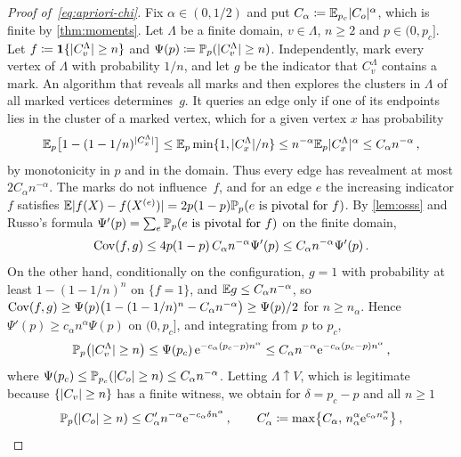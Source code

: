 \begin{proof}[Proof of~\eqref{eq:apriori-chi}]
Fix $\alpha\in(0,1/2)$ and put $C_\alpha\coloneqq\mathbb E_{p_c}\lvert C_o\rvert^\alpha$, which is finite by \cref{thm:moments}.
Let $\Lambda$ be a finite domain, $v\in\Lambda$, $n\ge2$ and $p\in(0,p_c]$. Let
$f\coloneqq\mathbf{1}\{\lvert C_v^\Lambda\rvert\ge n\}$ and $\Psi(p)\coloneqq\mathbb P_p(\lvert C_v^\Lambda\rvert\ge n)$. Independently,
mark every vertex of $\Lambda$ with probability $1/n$, and let $g$ be the indicator that $C_v^\Lambda$
contains a mark. An algorithm that reveals all marks and then explores the clusters in $\Lambda$ of all
marked vertices determines~$g$. It queries an edge only if one of its endpoints lies in the cluster of a
marked vertex, which for a given vertex $x$ has probability
\begin{equation*}
  \mathbb E_p\bigl[1-(1-1/n)^{\lvert C_x^\Lambda\rvert}\bigr]\le\mathbb E_p\min\{1,\lvert C_x^\Lambda\rvert/n\}
  \le n^{-\alpha}\mathbb E_p\lvert C_x^\Lambda\rvert^\alpha\le C_\alpha n^{-\alpha}\,,
\end{equation*}
by monotonicity in $p$ and in the domain. Thus every edge has revealment at most $2C_\alpha n^{-\alpha}$. The marks
do not influence~$f$, and for an edge $e$ the increasing indicator $f$ satisfies
$\mathbb E\lvert f(X)-f(X^{(e)})\rvert=2p(1-p)\mathbb P_p(e\text{ is pivotal for }f)$. By \cref{lem:osss} and Russo's
formula $\Psi'(p)=\sum_e\mathbb P_p(e\text{ is pivotal for }f)$ on the finite domain,
\begin{equation*}
  \operatorname{Cov}(f,g)\le4p(1-p)\,C_\alpha n^{-\alpha}\Psi'(p)\le C_\alpha n^{-\alpha}\Psi'(p)\,.
\end{equation*}
On the other hand, conditionally on the configuration, $g=1$ with probability at least $1-(1-1/n)^n$
on $\{f=1\}$, and $\mathbb E g\le C_\alpha n^{-\alpha}$, so $\operatorname{Cov}(f,g)\ge\Psi(p)\bigl(1-(1-1/n)^n-C_\alpha n^{-\alpha}\bigr)\ge\Psi(p)/2$
for $n\ge n_\alpha$. Hence $\Psi'(p)\ge c_\alpha n^\alpha\Psi(p)$ on $(0,p_c]$, and integrating from $p$ to $p_c$,
\begin{equation*}
  \mathbb P_p\bigl(\lvert C_v^\Lambda\rvert\ge n\bigr)\le\Psi(p_c)\,\mathrm{e}^{-c_\alpha(p_c-p)n^\alpha}\le C_\alpha n^{-\alpha}\mathrm{e}^{-c_\alpha(p_c-p)n^\alpha}\,,
\end{equation*}
where $\Psi(p_c)\le\mathbb P_{p_c}(\lvert C_o\rvert\ge n)\le C_\alpha n^{-\alpha}$. Letting $\Lambda\uparrow V$, which is legitimate
because $\{\lvert C_v\rvert\ge n\}$ has a finite witness, we obtain for $\delta=p_c-p$ and all $n\ge1$
\begin{equation*}
  \PP_p(\abs{C_o}\ge n)\le C'_\alpha n^{-\alpha}\e^{-c_\alpha\delta n^\alpha}\,,\qquad
  C'_\alpha\coloneqq\max\bigl\{C_\alpha,\,n_\alpha^\alpha\e^{c_\alpha n_\alpha^\alpha}\bigr\}\,,

\end{equation*}
\end{proof}
